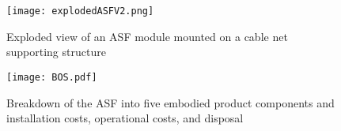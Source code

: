 
\begin{figure}[H]
\begin{center}
\texttt{[image: explodedASFV2.png]}
\caption{Exploded view of an ASF module mounted on a cable net supporting structure}
\label{fig:explodedView}
\end{center}
\end{figure}

\begin{figure}[ht]
\begin{center}
\texttt{[image: BOS.pdf]}
\caption{Breakdown of the ASF into five embodied product components and installation costs, operational costs, and disposal}

\label{fig:BOS}
\end{center}
\end{figure}

